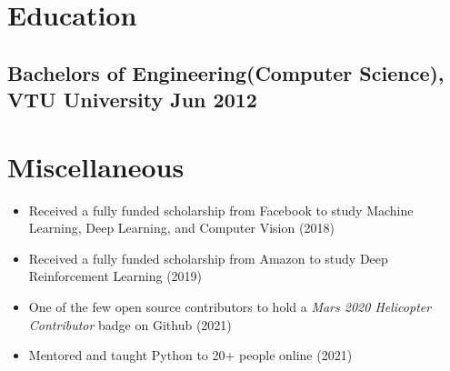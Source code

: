 \documentclass[a4,10pt]{article}
\newenvironment{zitemize}{
\begin{itemize}\itemsep0pt \parskip0pt \parsep1pt}
{\end{itemize}\vspace{-0.5cm}}
\newcommand{\hskills}[1]{
\textbf{\bfseries #1} }
\begin{document}
\section{Education }
\subsection*{Bachelors of Engineering(Computer Science), {\normalsize \normalfont VTU University} \hfill Jun 2012} 
\vspace{0.2cm}

\section{Miscellaneous }
\begin{zitemize}
        \item Received a fully funded scholarship from Facebook to study Machine Learning, Deep Learning, and Computer Vision (2018) 
        \item Received a fully funded scholarship from Amazon to study Deep Reinforcement Learning (2019)
        \item One of the few open source contributors to hold a \emph{Mars 2020 Helicopter Contributor} badge on Github (2021)
        \item Mentored and taught Python to 20+ people online (2021)
    \end{zitemize}
\vspace{0.2cm}




\end{document}
